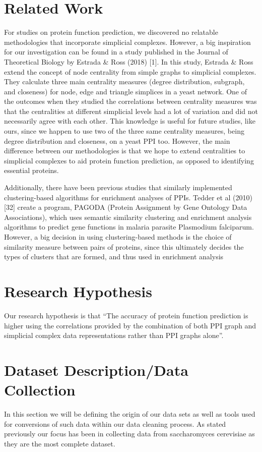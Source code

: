 \documentclass[9pt]{article}
\begin{document}
\section{Related Work}
For studies on protein function prediction, we discovered no relatable methodologies that incorporate simplicial complexes. However, a big inspiration for our investigation can be found in a study published in the Journal of Theoretical Biology by Estrada \& Ross (2018) [1]. In this study, Estrada \& Ross extend the concept of node centrality from simple graphs to simplicial complexes. They calculate three main centrality measures (degree distribution, subgraph, and closeness) for node, edge and triangle simplices in a yeast network. One of the outcomes when they studied the correlations between centrality measures was that the centralities at different simplicial levels had a lot of variation and did not necessarily agree with each other. This knowledge is useful for future studies, like ours, since we happen to use two of the three same centrality measures, being degree distribution and closeness, on a yeast PPI too. However, the main difference between our methodologies is that we hope to extend centralities to simplicial complexes to aid protein function prediction, as opposed to identifying essential proteins.
\par
Additionally, there have been previous studies that similarly implemented clustering-based algorithms for enrichment analyses of PPIs. Tedder et al (2010) [32] create a program, PAGODA (Protein Assignment by Gene Ontology Data Associations), which uses semantic similarity clustering and enrichment analysis algorithms to predict gene functions in malaria parasite Plasmodium falciparum. However, a big decision in using clustering-based methods is the choice of similarity measure between pairs of proteins, since this ultimately decides the types of clusters that are formed, and thus used in enrichment analysis

\section{Research Hypothesis}
Our research hypothesis is that “The accuracy of protein function prediction is higher using the correlations provided by the combination of both PPI graph and simplicial complex data representations rather than PPI graphs alone”. 

\section{Dataset Description/Data Collection}
In this section we will be defining the origin of our data sets as well as tools used for conversions of such data within our data cleaning process. As stated previously our focus has been in collecting data from saccharomyces cerevisiae as they are the most complete dataset.
\end{document}
